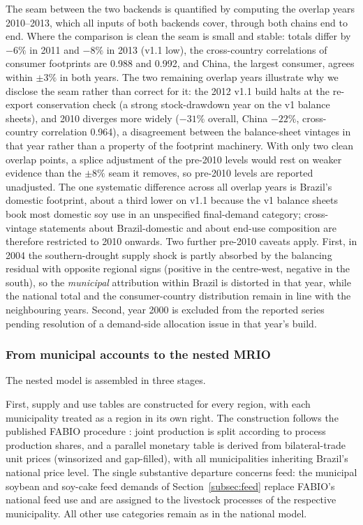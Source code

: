 \documentclass[pdflatex,sn-nature]{sn-jnl}%
\begin{document}
The seam between the two backends is quantified by computing the overlap
years 2010--2013, which all inputs of both backends cover, through both
chains end to end. Where the comparison is clean the seam is small and
stable: totals differ by $-6\%$ in 2011 and $-8\%$ in 2013 (v1.1 low), the
cross-country correlations of consumer footprints are 0.988 and 0.992, and
China, the largest consumer, agrees within $\pm3\%$ in both years. The two
remaining overlap years illustrate why we disclose the seam rather than
correct for it: the 2012 v1.1 build halts at the re-export conservation
check (a strong stock-drawdown year on the v1 balance sheets), and 2010
diverges more widely ($-31\%$ overall, China $-22\%$, cross-country
correlation 0.964), a disagreement between the balance-sheet vintages in
that year rather than a property of the footprint machinery. With only two
clean overlap points, a splice adjustment of the pre-2010 levels would rest
on weaker evidence than the $\pm$$8\%$ seam it removes, so pre-2010 levels
are reported unadjusted. The one systematic difference across all overlap
years is Brazil's domestic footprint, about a third lower on v1.1
because the v1 balance sheets book most domestic soy use in an unspecified
final-demand category; cross-vintage statements about Brazil-domestic and
about end-use composition are therefore restricted to 2010 onwards. Two
further pre-2010 caveats apply. First, in 2004 the southern-drought supply
shock is partly absorbed by the balancing residual with opposite regional
signs (positive in the centre-west, negative in the south), so the
\emph{municipal} attribution within Brazil is distorted in that year, while
the national total and the consumer-country distribution remain in line with
the neighbouring years. Second, year 2000 is excluded from the reported
series pending resolution of a demand-side allocation issue in that year's
build.

\subsubsection{From municipal accounts to the nested MRIO}
\label{subsubsec:supplyuse}\label{subsubsec:mrsut}\label{subsubsec:leontief}\label{subsubsec:hybrid}
The nested model is assembled in three stages.

First, supply and use tables are constructed for every region, with each
municipality treated as a region in its own right. The construction follows
the published FABIO procedure \cite{bruckner2019fabio}: joint production is
split according to process production shares, and a parallel monetary table
is derived from bilateral-trade unit prices (winsorized and gap-filled),
with all municipalities inheriting Brazil's national price level. The single
substantive departure concerns feed: the municipal soybean and soy-cake feed
demands of Section~\ref{subsec:feed} replace FABIO's national feed use and
are assigned to the livestock processes of the respective municipality. All
other use categories remain as in the national model.
\end{document}
